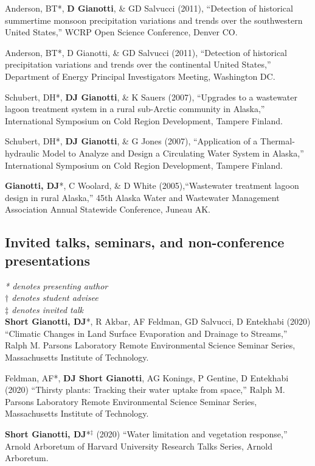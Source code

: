 \documentclass[10pt, a4paper]{article}
\renewcommand{\emph}[1]{\textit{#1}}
\newcommand{\lbr}{\vspace*{12pt}}
\newcommand{\years}[1]{\mbox{}\marginnote{\scriptsize #1}} %
\begin{document}
\years{2011}Anderson, BT*, \textbf{D Gianotti}, \& GD Salvucci (2011), ``Detection of historical summertime monsoon precipitation variations and trends over the southwestern United States,'' WCRP Open Science Conference, Denver CO.\lbr

\years{2011}Anderson, BT*, D Gianotti, \& GD Salvucci (2011), ``Detection of historical precipitation variations and trends over the continental United States,'' Department of Energy Principal Investigators Meeting, Washington DC.\lbr

\years{2007}Schubert, DH*, \textbf{DJ Gianotti}, \& K Sauers (2007), ``Upgrades to a  wastewater lagoon treatment system in a rural sub-Arctic community in Alaska,'' International Symposium on Cold Region Development, Tampere Finland.\lbr

\years{2007}Schubert, DH*, \textbf{DJ Gianotti}, \& G Jones (2007), ``Application of a Thermal-hydraulic Model to Analyze and Design a Circulating Water System in Alaska,'' International Symposium on Cold Region Development, Tampere Finland.\lbr

\years{2005}\textbf{Gianotti, DJ}*, C Woolard, \& D White (2005),``Wastewater treatment lagoon design in rural Alaska,'' 45th Alaska Water and Wastewater Management Association Annual Statewide Conference, Juneau AK.\lbr


\subsection*{Invited talks, seminars, and non-conference presentations}
\emph{* denotes presenting author}
\\ \emph{$\dagger$ denotes student advisee}
\\ \emph{$\ddag$ denotes invited talk}\\

\years{2020}\textbf{Short Gianotti, DJ}*, R Akbar, AF Feldman, GD Salvucci, D Entekhabi (2020) ``Climatic Changes in Land Surface Evaporation and Drainage to Streams,'' Ralph M. Parsons Laboratory Remote Environmental Science Seminar Series, Massachusetts Institute of Technology.\lbr %

\years{2020}Feldman, AF*, \textbf{DJ Short Gianotti}, AG Konings, P Gentine, D Entekhabi (2020) ``Thirsty plants: Tracking their water uptake from space,'' Ralph M. Parsons Laboratory Remote Environmental Science Seminar Series, Massachusetts Institute of Technology.\lbr %
			
\years{2020}\textbf{Short Gianotti, DJ}*$^\ddag$ (2020) ``Water limitation and vegetation response,'' Arnold Arboretum of Harvard University Research Talks Series, Arnold Arboretum.\lbr %
\end{document}
